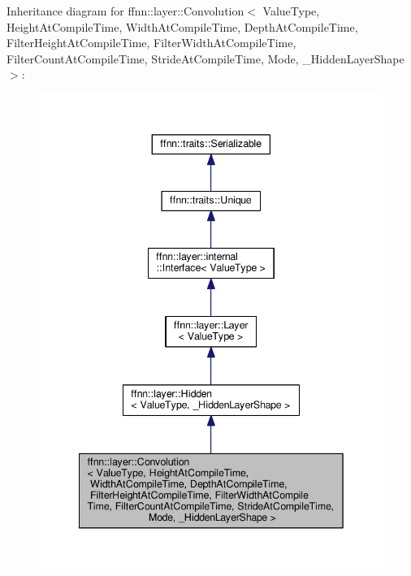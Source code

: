 Inheritance diagram for ffnn\-:\-:layer\-:\-:Convolution$<$ Value\-Type, Height\-At\-Compile\-Time, Width\-At\-Compile\-Time, Depth\-At\-Compile\-Time, Filter\-Height\-At\-Compile\-Time, Filter\-Width\-At\-Compile\-Time, Filter\-Count\-At\-Compile\-Time, Stride\-At\-Compile\-Time, Mode, \-\_\-\-Hidden\-Layer\-Shape $>$\-:
\nopagebreak
\begin{figure}[H]
\begin{center}
\leavevmode
\includegraphics[width=342pt]{classffnn_1_1layer_1_1_convolution__inherit__graph}
\end{center}
\end{figure}


